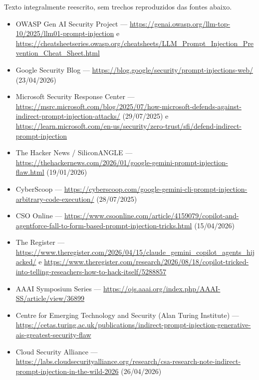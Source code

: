\documentclass[12pt,a4paper]{article}
\begin{document}
\noindent Texto integralmente reescrito, sem trechos reproduzidos das fontes abaixo.

\begin{itemize}
  \item OWASP Gen AI Security Project --- \url{https://genai.owasp.org/llm-top-10/2025/llm01-prompt-injection} e \url{https://cheatsheetseries.owasp.org/cheatsheets/LLM_Prompt_Injection_Prevention_Cheat_Sheet.html}
  \item Google Security Blog --- \url{https://blog.google/security/prompt-injections-web/} (23/04/2026)
  \item Microsoft Security Response Center --- \url{https://msrc.microsoft.com/blog/2025/07/how-microsoft-defends-against-indirect-prompt-injection-attacks/} (29/07/2025) e \url{https://learn.microsoft.com/en-us/security/zero-trust/sfi/defend-indirect-prompt-injection}
  \item The Hacker News / SiliconANGLE --- \url{https://thehackernews.com/2026/01/google-gemini-prompt-injection-flaw.html} (19/01/2026)
  \item CyberScoop --- \url{https://cyberscoop.com/google-gemini-cli-prompt-injection-arbitrary-code-execution/} (28/07/2025)
  \item CSO Online --- \url{https://www.csoonline.com/article/4159079/copilot-and-agentforce-fall-to-form-based-prompt-injection-tricks.html} (15/04/2026)
  \item The Register --- \url{https://www.theregister.com/2026/04/15/claude_gemini_copilot_agents_hijacked/} e \url{https://www.theregister.com/research/2026/08/18/copilot-tricked-into-telling-reseachers-how-to-hack-itself/5288857}
  \item AAAI Symposium Series --- \url{https://ojs.aaai.org/index.php/AAAI-SS/article/view/36899}
  \item Centre for Emerging Technology and Security (Alan Turing Institute) --- \url{https://cetas.turing.ac.uk/publications/indirect-prompt-injection-generative-ais-greatest-security-flaw}
  \item Cloud Security Alliance --- \url{https://labs.cloudsecurityalliance.org/research/csa-research-note-indirect-prompt-injection-in-the-wild-2026} (26/04/2026)
\end{itemize}
\end{document}
